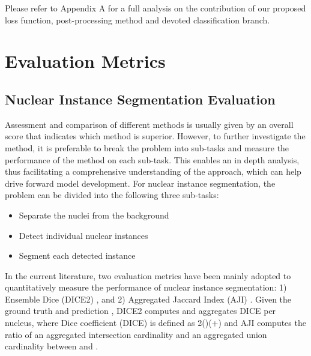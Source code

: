 \documentclass[journal]{IEEEtran}
\begin{document}
	
		
	Please refer to Appendix A for a full analysis on the contribution of our proposed loss function, post-processing method and devoted classification branch.
	
	\section{Evaluation Metrics} \label{section:metrics}
\subsection{Nuclear Instance Segmentation Evaluation} \label{section:metrics_inst}

    Assessment and comparison of different methods is usually given by an overall score that indicates which method is superior. However, to further investigate the method, it is preferable to break the problem into sub-tasks and measure the performance of the method on each sub-task. This enables an in depth analysis, thus facilitating a comprehensive understanding of the approach, which can help drive forward model development. For nuclear instance segmentation, the problem can be divided into the following three sub-tasks:
	\begin{itemize}
		\item Separate the nuclei from the background
		\item Detect individual nuclear instances
		\item Segment each detected instance
	\end{itemize}
	In the current literature, two evaluation metrics have been mainly adopted to quantitatively measure the performance of nuclear instance segmentation: 1) Ensemble Dice (DICE2) \cite{vu2018methods}, and 2) Aggregated Jaccard Index (AJI) \cite{kumar}. Given the ground truth  and prediction , DICE2 computes and aggregates DICE per nucleus, where Dice coefficient (DICE) is defined as 2()(+) and AJI computes the ratio of an aggregated intersection cardinality and an aggregated union cardinality between  and . 
	
\end{document}
